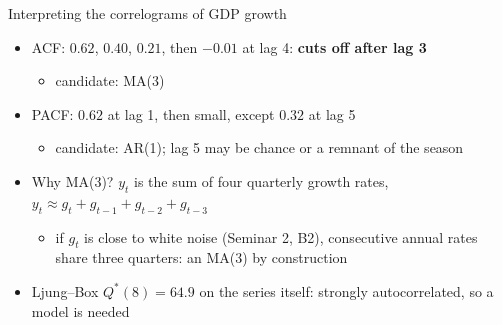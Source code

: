 \begin{frame}{Interpreting the correlograms of GDP growth}
\itemsize{\small}
\begin{itemize}
    \item ACF: $0.62$, $0.40$, $0.21$, then $\ensuremath{-}0.01$ at lag 4: \textbf{cuts off after lag 3}
    \begin{itemize}
        \item candidate: MA(3)
    \end{itemize}
    \item PACF: $0.62$ at lag 1, then small, except $0.32$ at lag 5
    \begin{itemize}
        \item candidate: AR(1); lag 5 may be chance or a remnant of the season
    \end{itemize}
    \item Why MA(3)? $y_t$ is the sum of four quarterly growth rates, $y_t \approx g_t + g_{t-1} + g_{t-2} + g_{t-3}$
    \begin{itemize}
        \item if $g_t$ is close to white noise (Seminar 2, B2), consecutive annual rates share three quarters: an MA(3) by construction
    \end{itemize}
    \item Ljung--Box $Q^*(8) = 64.9$ on the series itself: strongly autocorrelated, so a model is needed
\end{itemize}
\end{frame}

